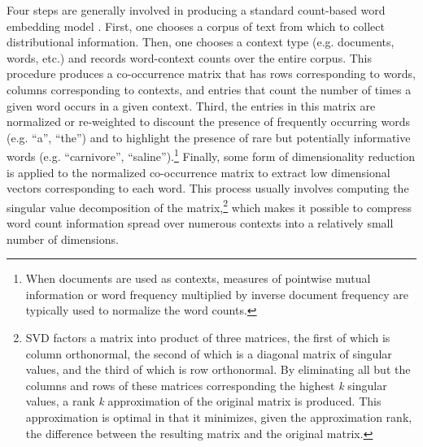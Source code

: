 Four steps are generally involved in producing a standard count-based word embedding model \citep{TurneyPantel:2010,LandauerDumais:1997,Baroni:2014}. First, one chooses a corpus of text from which to collect distributional information. Then, one chooses a context type (e.g. documents, words, etc.) and records word-context counts over the entire corpus. This procedure produces a co-occurrence matrix that has rows corresponding to words, columns corresponding to contexts, and entries that count the number of times a given word occurs in a given context. Third, the entries in this matrix are normalized or re-weighted to discount the presence of frequently occurring words (e.g. ``a'', ``the'') and to highlight the presence of rare but potentially informative words (e.g. ``carnivore'', ``saline'').\footnote{When documents are used as contexts, measures of pointwise mutual information or word frequency multiplied by inverse document frequency are typically used to normalize the word counts.} Finally, some form of dimensionality reduction is applied to the normalized co-occurrence matrix to extract low dimensional vectors corresponding to each word. This process usually involves computing the singular value decomposition of the matrix,\footnote{SVD factors a matrix into product of three matrices, the first of which is column orthonormal, the second of which is a diagonal matrix of singular values, and the third of which is row orthonormal. By eliminating all but the columns and rows of these matrices corresponding the highest \textit{k} singular values, a rank \textit{k} approximation of the original matrix is produced. This approximation is optimal in that it minimizes, given the approximation rank, the difference between the resulting matrix and the original matrix.} which makes it possible to compress word count information spread over numerous contexts into a relatively small number of dimensions.

